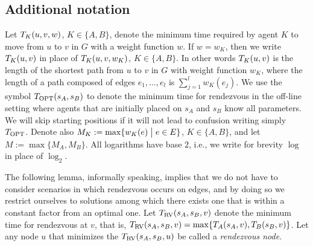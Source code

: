 \documentclass{llncs}
\newcommand{\Topt}[2]{T_{{\scriptsize \textup{OPT}}}(#1,#2)}
\newcommand{\Topts}{T_{\scriptsize \textup{OPT}}}
\newcommand{\dist}[4][]{\if!#1!T_{#2}(#3,#4)\else T_{#2}(#3,#4,#1)\fi}
\newcommand{\TRV}[3]{T_{{\scriptsize \textup{RV}}}(#1,#2,#3)}
\newcommand{\startpos}[1]{s_{#1}}
\newcommand{\starta}{\startpos{A}}
\newcommand{\startb}{\startpos{B}}
\newcommand{\agentVariable}{K}
\newcommand{\st}{\hspace{0.1cm}\bigl|\bigr.\hspace{0.1cm}}
\begin{document}
\subsection{Additional notation}
Let $\dist[w]{\agentVariable}{u}{v}$, ${\agentVariable}\in\{A,B\}$, 
denote the minimum time required by agent ${\agentVariable}$ to move from $u$ to $v$ in $G$ with a weight function $w$.
If $w=w_{\agentVariable}$, then we write $\dist{{\agentVariable}}{u}{v}$ in place of $\dist[w_{\agentVariable}]{\agentVariable}{u}{v}$, 
${\agentVariable}\in\{A,B\}$.
In other words $\dist{\agentVariable}{u}{v}$ is the length of the shortest path from $u$ to $v$ in $G$ with weight function $w_{\agentVariable}$, where the length of a path composed of edges $e_1,\ldots,e_l$ is $\sum_{j=1}^lw_{\agentVariable}(e_j)$.
We use the symbol $\Topt{\starta}{\startb}$ to denote the minimum time for rendezvous in the off-line setting where agents that are initially placed on $\starta$ and $\startb$ know all parameters. We will skip starting positions if it will not lead to confusion writing simply $\Topts$.
Denote also $M_{\agentVariable}:=\max\{w_{\agentVariable}(e)\st e\in E\}$, ${\agentVariable}\in\{A,B\}$, and let $M:=\max\{M_A,M_B\}$.
All logarithms have base $2$, i.e., we write for brevity $\log$ in place of $\log_2$.

The following lemma, informally speaking, implies that we do not have to consider scenarios in which rendezvous occurs on edges, and by doing so we restrict ourselves to solutions among which there exists one that is within a constant factor from an optimal one.
Let $\TRV{\starta}{\startb}{v}$ denote the minimum time for rendezvous at $v$, that is, $\TRV{\starta}{\startb}{v}=\max \{ \dist{A}{\startpos{A}}{v}, \dist{B}{\startpos{B}}{v} \}$.
Let any node $u$ that minimizes the $\TRV{\starta}{\startb}{u}$ be called a \emph{rendezvous node}.
\end{document}
